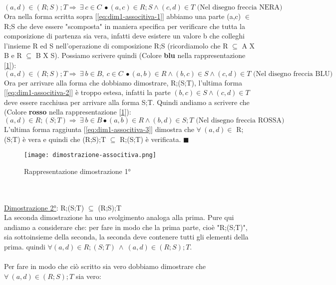 \begin{demostration}
        \begin{equation}
            (a,d) \in (R;S);T \Longrightarrow \: \exists \: c \in C \: \bullet (a,c) \in R;S \land (c,d) \in T \text{ (Nel disegno freccia NERA)}
            \label{eq:dim1-associtiva-1}
        \end{equation}
        Ora nella forma scritta sopra [\ref{eq:dim1-associtiva-1}] abbiamo una parte (a,c) $\in$ R;S che deve essere "scomposta" in maniera specifica per verificare che tutta la composizione di partenza sia vera, infatti deve esistere un valore b che colleghi l'insieme R ed S nell'operazione di composizione R;S (ricordiamolo che R $\subseteq$ A X B e R $\subseteq$ B X S). Possiamo scrivere quindi (Colore \textbf{blu} nella rappresentazione [\ref{fig:rappresentazioni-dim-associtiva}]):
        \begin{equation}
            (a,d) \in (R;S);T \Longrightarrow \: \exists \: b \in B, \: c \in C \: \bullet (a,b) \in R \land (b,c) \in S \land (c,d) \in T \text{ (Nel disegno freccia BLU)}
            \label{eq:dim1-associtiva-2}
        \end{equation}
        Ora per arrivare alla forma che dobbiamo dimostrare, R;(S;T), l'ultima forma [\ref{eq:dim1-associtiva-2}] è troppo estesa, infatti la parte $(b,c) \in S \land (c,d) \in T$ deve essere racchiusa per arrivare alla forma S;T. Quindi andiamo a scrivere che (Colore \textbf{rosso} nella rappresentazione [\ref{fig:rappresentazioni-dim-associtiva}]):
        \begin{equation}
            (a,d) \in R;(S;T) \Longrightarrow \: \exists \: b \in B \bullet (a,b) \in R \land (b,d) \in S;T \text{ (Nel disegno freccia ROSSA)}
            \label{eq:dim1-associtiva-3}
        \end{equation}
        L'ultima forma raggiunta [\ref{eq:dim1-associtiva-3}] dimostra che $\forall \: (a,d) \in$ R;(S;T) è vera e quindi che (R;S);T $\subseteq$ R;(S;T) è verificata. $\blacksquare$
        \begin{figure}[h!]
            \centering
            \texttt{[image: dimostrazione-associtiva.png]}
            \vspace{-10pt}
            \caption{Rappresentazione dimostrazione 1°}
            \label{fig:rappresentazioni-dim-associtiva}
        \end{figure}
        \\\\
        \underline{Dimostrazione 2°}: R;(S;T) $\subseteq$ (R;S);T\\
        La seconda dimostrazione ha uno svolgimento analoga alla prima. Pure qui andiamo a considerare che: per fare in modo che la prima parte, cioè "R;(S;T)", sia sottoinsieme della seconda, la seconda deve contenere tutti gli elementi della prima. quindi $\forall (a,d) \in R;(S;T) \: \land \:(a,d) \in (R;S);T$. \\ \\Per fare in modo che ciò scritto sia vero dobbiamo dimostrare che $\forall \: (a,d) \in (R;S);T$ sia vero:\\

\end{demostration}
